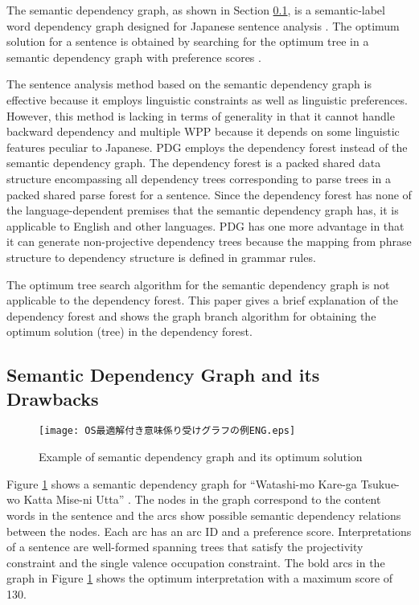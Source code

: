 The semantic dependency graph, as shown in Section
\ref{sec:SemanticDependencyGraph}, is a semantic-label word
dependency graph designed for Japanese sentence analysis
\cite{Hirakawa89}. The optimum solution for a sentence is obtained by
searching for the optimum tree in a semantic dependency graph with
preference scores \cite{Hirakawa01}. 

The sentence analysis method based on the semantic dependency graph is
effective because it employs linguistic constraints as well as
linguistic preferences. However, this method is lacking in terms of
generality in that it cannot handle backward dependency and multiple
WPP because it depends on some linguistic features peculiar to
Japanese. PDG employs the dependency forest instead of the semantic
dependency graph. The dependency forest is a packed shared data
structure encompassing all dependency trees corresponding to parse
trees in a packed shared parse forest \cite{Tomita91} for a
sentence. Since the dependency forest has none of the
language-dependent premises that the semantic dependency graph has, it
is applicable to English and other languages. PDG has one more
advantage in that it can generate non-projective dependency trees
because the mapping from phrase structure to dependency structure is
defined in grammar rules.

The optimum tree search algorithm for the semantic dependency graph is
not applicable to the dependency forest. This paper gives a brief
explanation of the dependency forest and shows the graph branch
algorithm for obtaining the optimum solution (tree) in the dependency
forest.

\subsection{Semantic Dependency Graph and its Drawbacks} 
\label{sec:SemanticDependencyGraph}

\begin{figure}[b]
 \begin{center}
     \texttt{[image: OS最適解付き意味係り受けグラフの例ENG.eps]}
 \end{center}
\myfiglabelskippre
\caption{Example of semantic dependency graph and its optimum solution}
\label{fig:ImiKakariGraphWithOptSol}
\end{figure}

Figure \ref{fig:ImiKakariGraphWithOptSol} shows a semantic dependency graph
for ``Watashi-mo Kare-ga Tsukue-wo Katta Mise-ni Utta''
 \cite{Hirakawa01}. The nodes in the graph correspond to the content words in the
sentence and the arcs show possible semantic dependency relations between
the nodes. Each arc has an arc ID and a preference score. Interpretations
of a sentence are well-formed spanning trees that satisfy the
projectivity constraint and the single valence occupation constraint.
The bold arcs in the graph in
Figure \ref{fig:ImiKakariGraphWithOptSol} shows the optimum
interpretation with a maximum score of 130.

